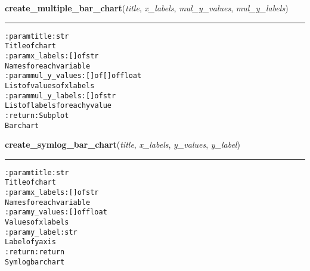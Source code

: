     \label{hal:charts:bar:create_multiple_bar_chart}

    \vspace{0.5ex}

\hspace{.8\funcindent}\begin{boxedminipage}{\funcwidth}

    \raggedright \textbf{create\_multiple\_bar\_chart}(\textit{title}, \textit{x\_labels}, \textit{mul\_y\_values}, \textit{mul\_y\_labels})

    \vspace{-1.5ex}

    \rule{\textwidth}{0.5\fboxrule}
\setlength{\parskip}{2ex}
\begin{alltt}

:param title: str
    Title of chart
:param x\_labels: [] of str
    Names for each variable
:param mul\_y\_values: [] of [] of float
    List of values of x labels
:param mul\_y\_labels: [] ofstr
    List of labels for each y value
:return: Subplot
    Bar chart
\end{alltt}

\setlength{\parskip}{1ex}
    \end{boxedminipage}

    \label{hal:charts:bar:create_symlog_bar_chart}

    \vspace{0.5ex}

\hspace{.8\funcindent}\begin{boxedminipage}{\funcwidth}

    \raggedright \textbf{create\_symlog\_bar\_chart}(\textit{title}, \textit{x\_labels}, \textit{y\_values}, \textit{y\_label})

    \vspace{-1.5ex}

    \rule{\textwidth}{0.5\fboxrule}
\setlength{\parskip}{2ex}
\begin{alltt}

:param title: str
    Title of chart
:param x\_labels: [] of str
    Names for each variable
:param y\_values: [] of float
    Values of x labels
:param y\_label: str
    Label of y axis
:return: return
    Symlog bar chart
\end{alltt}

\setlength{\parskip}{1ex}
    \end{boxedminipage}

